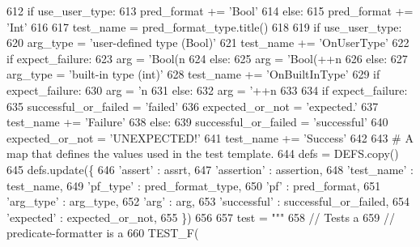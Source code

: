 \begin{DoxyCode}
{{{{{{{{{{{{{{{{{{{{{{{{{{{{{{{{{{{{{{{{{{{{{{{{{{{{612         \textcolor{keywordflow}{if} use\_user\_type:
613           pred\_format += \textcolor{stringliteral}{'Bool'}
614         \textcolor{keywordflow}{else}:
615           pred\_format += \textcolor{stringliteral}{'Int'}
616 
617     test\_name = pred\_format\_type.title()
618 
619     \textcolor{keywordflow}{if} use\_user\_type:
620       arg\_type = \textcolor{stringliteral}{'user-defined type (Bool)'}
621       test\_name += \textcolor{stringliteral}{'OnUserType'}
622       \textcolor{keywordflow}{if} expect\_failure:
623         arg = \textcolor{stringliteral}{'Bool(n%
624       \textcolor{keywordflow}{else}:
625         arg = \textcolor{stringliteral}{'Bool(++n%
626     \textcolor{keywordflow}{else}:
627       arg\_type = \textcolor{stringliteral}{'built-in type (int)'}
628       test\_name += \textcolor{stringliteral}{'OnBuiltInType'}
629       \textcolor{keywordflow}{if} expect\_failure:
630         arg = \textcolor{stringliteral}{'n%
631       \textcolor{keywordflow}{else}:
632         arg = \textcolor{stringliteral}{'++n%
633 
634     \textcolor{keywordflow}{if} expect\_failure:
635       successful\_or\_failed = \textcolor{stringliteral}{'failed'}
636       expected\_or\_not = \textcolor{stringliteral}{'expected.'}
637       test\_name +=  \textcolor{stringliteral}{'Failure'}
638     \textcolor{keywordflow}{else}:
639       successful\_or\_failed = \textcolor{stringliteral}{'successful'}
640       expected\_or\_not = \textcolor{stringliteral}{'UNEXPECTED!'}
641       test\_name +=  \textcolor{stringliteral}{'Success'}
642 
643     \textcolor{comment}{# A map that defines the values used in the test template.}
644     defs = DEFS.copy()
645     defs.update(\{
646       \textcolor{stringliteral}{'assert'} : assrt,
647       \textcolor{stringliteral}{'assertion'} : assertion,
648       \textcolor{stringliteral}{'test\_name'} : test\_name,
649       \textcolor{stringliteral}{'pf\_type'} : pred\_format\_type,
650       \textcolor{stringliteral}{'pf'} : pred\_format,
651       \textcolor{stringliteral}{'arg\_type'} : arg\_type,
652       \textcolor{stringliteral}{'arg'} : arg,
653       \textcolor{stringliteral}{'successful'} : successful\_or\_failed,
654       \textcolor{stringliteral}{'expected'} : expected\_or\_not,
655       \})
656 
657     test = \textcolor{stringliteral}{"""}
658 \textcolor{stringliteral}{// Tests a %
659 \textcolor{stringliteral}{// predicate-formatter is a %
660 \textcolor{stringliteral}{TEST\_F(%
}}}}}}}}}}}}}}}}}}}}}}}}}}}}}}}}}}}}}}}}}}}}}}}}}}}}}}}}}}}
\end{DoxyCode}

